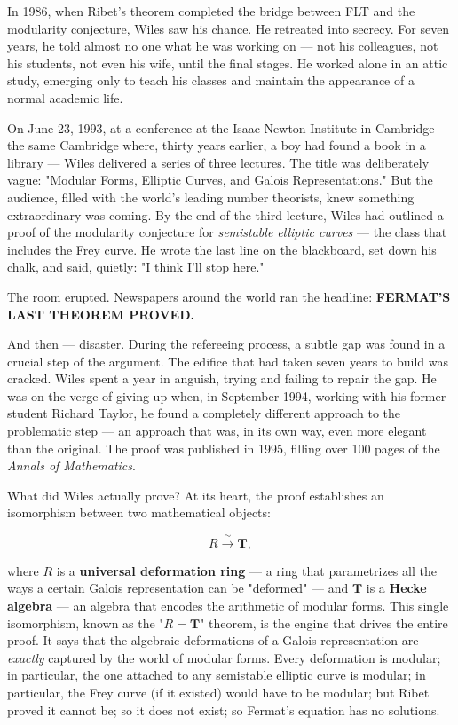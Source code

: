 In 1986, when Ribet's theorem completed the bridge between FLT and the modularity conjecture, Wiles saw his chance. He retreated into secrecy. For seven years, he told almost no one what he was working on --- not his colleagues, not his students, not even his wife, until the final stages. He worked alone in an attic study, emerging only to teach his classes and maintain the appearance of a normal academic life.

On June 23, 1993, at a conference at the Isaac Newton Institute in Cambridge --- the same Cambridge where, thirty years earlier, a boy had found a book in a library --- Wiles delivered a series of three lectures. The title was deliberately vague: "Modular Forms, Elliptic Curves, and Galois Representations." But the audience, filled with the world's leading number theorists, knew something extraordinary was coming. By the end of the third lecture, Wiles had outlined a proof of the modularity conjecture for \textit{semistable elliptic curves} --- the class that includes the Frey curve. He wrote the last line on the blackboard, set down his chalk, and said, quietly: "I think I'll stop here."

The room erupted. Newspapers around the world ran the headline: \textbf{FERMAT'S LAST THEOREM PROVED.}

And then --- disaster. During the refereeing process, a subtle gap was found in a crucial step of the argument. The edifice that had taken seven years to build was cracked. Wiles spent a year in anguish, trying and failing to repair the gap. He was on the verge of giving up when, in September 1994, working with his former student Richard Taylor, he found a completely different approach to the problematic step --- an approach that was, in its own way, even more elegant than the original. The proof was published in 1995, filling over 100 pages of the \textit{Annals of Mathematics}.

What did Wiles actually prove? At its heart, the proof establishes an isomorphism between two mathematical objects:

\[
R \xrightarrow{\;\sim\;} \mathbf{T},
\]

where $R$ is a \textbf{universal deformation ring} --- a ring that parametrizes all the ways a certain Galois representation can be "deformed" --- and $\mathbf{T}$ is a \textbf{Hecke algebra} --- an algebra that encodes the arithmetic of modular forms. This single isomorphism, known as the "$R = \mathbf{T}$" theorem, is the engine that drives the entire proof. It says that the algebraic deformations of a Galois representation are \textit{exactly} captured by the world of modular forms. Every deformation is modular; in particular, the one attached to any semistable elliptic curve is modular; in particular, the Frey curve (if it existed) would have to be modular; but Ribet proved it cannot be; so it does not exist; so Fermat's equation has no solutions.

